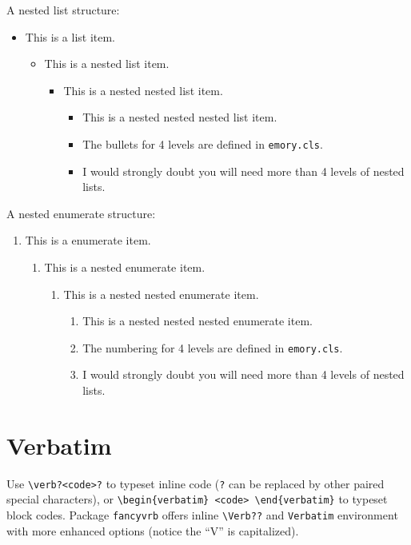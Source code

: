 \documentclass[draft]{emory}
\begin{document}
A nested list structure:
\begin{itemize}
  \item This is a list item.
  \begin{itemize}
    \item This is a nested list item.
    \begin{itemize}
      \item This is a nested nested list item.
      \begin{itemize}
        \item This is a nested nested nested list item. 
        \item The bullets for 4 levels are defined in \Verb|emory.cls|.
        \item I would strongly doubt you will need more than 4 levels of nested lists.
      \end{itemize}
    \end{itemize}
  \end{itemize}    
\end{itemize}

A nested enumerate structure:
\begin{enumerate}
  \item This is a enumerate item.
  \begin{enumerate}
    \item This is a nested enumerate item.
    \begin{enumerate}
      \item This is a nested nested enumerate item.
      \begin{enumerate}
        \item This is a nested nested nested enumerate item. 
        \item The numbering for 4 levels are defined in \Verb|emory.cls|.
        \item I would strongly doubt you will need more than 4 levels of nested lists.
      \end{enumerate}
    \end{enumerate}
  \end{enumerate}    
\end{enumerate}

\section{Verbatim}

Use \Verb|\verb?<code>?| to typeset inline code  (\Verb|?| can be replaced by
other paired special characters),
or  \Verb|\begin{verbatim} <code> \end{verbatim}| to typeset block codes.
Package \Verb|fancyvrb| offers inline \Verb|\Verb??| and \Verb|Verbatim| environment with more enhanced
options (notice the ``V'' is capitalized).
\end{document}
